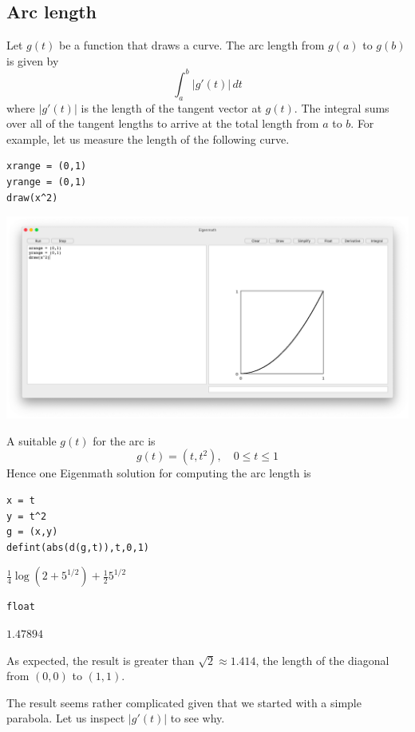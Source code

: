 
\subsection{Arc length}
Let $g(t)$ be a function that draws a curve.
The arc length from $g(a)$ to $g(b)$ is given by
$$\int_a^b|g'(t)|\,dt$$
where $|g'(t)|$ is the length of the tangent vector at $g(t)$.
The integral sums over all of the tangent lengths to arrive at the total length
from $a$ to $b$.
For example, let us measure the length of the following curve.

\begin{Verbatim}[formatcom=\color{blue},samepage=true]
xrange = (0,1)
yrange = (0,1)
draw(x^2)
\end{Verbatim}

\begin{center}
\includegraphics[scale=0.2]{arc.png}
\end{center}

A suitable $g(t)$ for the arc is
$$g(t)=(t,t^2),\quad0\le t\le1$$
Hence one Eigenmath solution for computing the arc length is

\begin{Verbatim}[formatcom=\color{blue},samepage=true]
x = t
y = t^2
g = (x,y)
defint(abs(d(g,t)),t,0,1)
\end{Verbatim}

$\displaystyle \frac{1}{4}\log(2+5^{1/2})+\frac{1}{2}5^{1/2}$

\begin{Verbatim}[formatcom=\color{blue},samepage=true]
float
\end{Verbatim}

$\displaystyle 1.47894$

As expected, the result is greater than $\sqrt2\approx1.414$,
the length of the
diagonal from $(0,0)$ to $(1,1)$.

The result seems rather complicated given that we
started with a simple parabola.
Let us inspect $|g'(t)|$ to see why.

